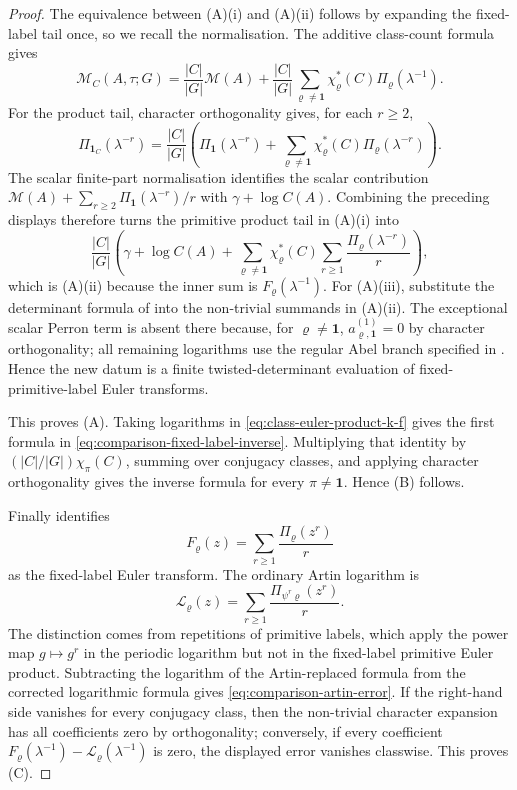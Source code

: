 \begin{proof}
  The equivalence between \textup{(A)(i)} and \textup{(A)(ii)} follows by
  expanding the fixed-label tail once, so we recall the normalisation.  The
  additive class-count formula gives
  \[
    \mathcal M_C(A,\tau;G)
    =\frac{|C|}{|G|}\mathcal M(A)
      +\frac{|C|}{|G|}
       \sum_{\varrho\ne\mathbf1}\chi_\varrho^\ast(C)
       \Pi_\varrho(\lambda^{-1}).
  \]
  For the product tail, character orthogonality gives, for each \(r\ge2\),
  \[
    \Pi_{\mathbf1_C}(\lambda^{-r})
    =\frac{|C|}{|G|}
      \left(
        \Pi_{\mathbf1}(\lambda^{-r})
        +\sum_{\varrho\ne\mathbf1}\chi_\varrho^\ast(C)
          \Pi_\varrho(\lambda^{-r})
      \right).
  \]
  The scalar finite-part normalisation identifies the scalar contribution
  \(\mathcal M(A)+\sum_{r\ge2}\Pi_{\mathbf1}(\lambda^{-r})/r\) with
  \(\gamma+\log C(A)\).  Combining the preceding displays therefore turns
  the primitive product tail in \textup{(A)(i)} into
  \[
    \frac{|C|}{|G|}
    \left(
      \gamma+\log C(A)
      +\sum_{\varrho\ne\mathbf1}\chi_\varrho^\ast(C)
        \sum_{r\ge1}\frac{\Pi_\varrho(\lambda^{-r})}{r}
    \right),
  \]
  which is \textup{(A)(ii)} because the inner sum is
  \(F_\varrho(\lambda^{-1})\).  For \textup{(A)(iii)}, substitute the
  determinant formula of  into
  the non-trivial summands in \textup{(A)(ii)}. The exceptional scalar Perron
  term is absent there because, for \(\varrho\neq\mathbf1\),
  \(a_{\varrho,\mathbf1}^{(1)}=0\) by character orthogonality; all remaining
  logarithms use the regular Abel branch specified in
  . Hence the new datum is a finite
  twisted-determinant evaluation of fixed-primitive-label Euler transforms.

  This proves \textup{(A)}.  Taking logarithms in
  \eqref{eq:class-euler-product-k-f} gives the first formula in
  \eqref{eq:comparison-fixed-label-inverse}. Multiplying that identity by
  \((|C|/|G|)\chi_\pi(C)\), summing over conjugacy classes, and applying
  character orthogonality gives the inverse formula for every
  \(\pi\ne\mathbf1\).  Hence \textup{(B)} follows.

  Finally  identifies
  \[
    F_\varrho(z)=\sum_{r\ge1}\frac{\Pi_\varrho(z^r)}{r}
  \]
  as the fixed-label Euler transform.  The ordinary Artin logarithm is
  \[
    \mathcal L_\varrho(z)=
    \sum_{r\ge1}\frac{\Pi_{\psi^r\varrho}(z^r)}{r}.
  \]
  The distinction comes from
  repetitions of primitive labels, which apply the power map
  \(g\mapsto g^r\) in the periodic logarithm but not in the fixed-label
  primitive Euler product. Subtracting the logarithm of the Artin-replaced
  formula from the corrected logarithmic formula gives
  \eqref{eq:comparison-artin-error}.  If the right-hand side vanishes for
  every conjugacy class, then the non-trivial character expansion has all
  coefficients zero by orthogonality; conversely, if every coefficient
  \(F_\varrho(\lambda^{-1})-
  \mathcal L_\varrho(\lambda^{-1})\) is zero, the displayed error vanishes
  classwise.  This proves \textup{(C)}.


\end{proof}
